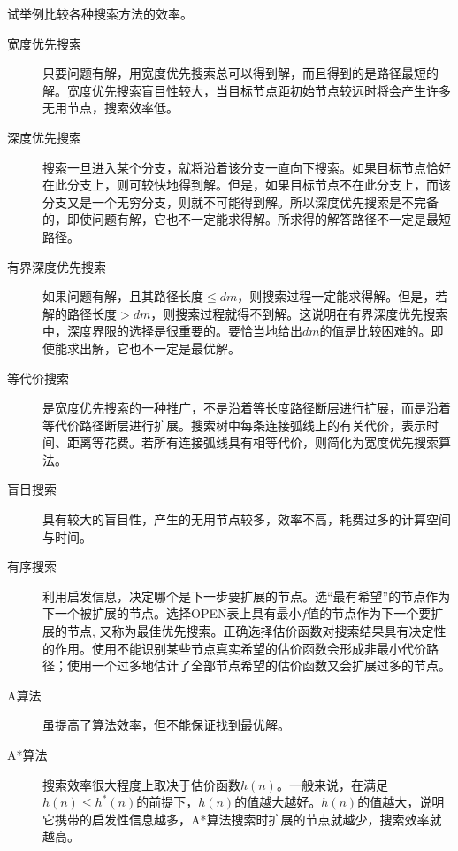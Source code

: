 \begin{question}
试举例比较各种搜索方法的效率。
\end{question}	
\begin{solution}
	\begin{description}
		\item[宽度优先搜索] 只要问题有解，用宽度优先搜索总可以得到解，而且得到的是路径最短的解。宽度优先搜索盲目性较大，当目标节点距初始节点较远时将会产生许多无用节点，搜索效率低。
		\item[深度优先搜索] 搜索一旦进入某个分支，就将沿着该分支一直向下搜索。如果目标节点恰好在此分支上，则可较快地得到解。但是，如果目标节点不在此分支上，而该分支又是一个无穷分支，则就不可能得到解。所以深度优先搜索是不完备的，即使问题有解，它也不一定能求得解。所求得的解答路径不一定是最短路径。
		\item[有界深度优先搜索] 如果问题有解，且其路径长度$\leq dm$，则搜索过程一定能求得解。但是，若解的路径长度$> dm$，则搜索过程就得不到解。这说明在有界深度优先搜索中，深度界限的选择是很重要的。要恰当地给出$dm$的值是比较困难的。即使能求出解，它也不一定是最优解。
		\item[等代价搜索] 是宽度优先搜索的一种推广，不是沿着等长度路径断层进行扩展，而是沿着等代价路径断层进行扩展。搜索树中每条连接弧线上的有关代价，表示时间、距离等花费。若所有连接弧线具有相等代价，则简化为宽度优先搜索算法。
		\item[盲目搜索] 具有较大的盲目性，产生的无用节点较多，效率不高，耗费过多的计算空间与时间。
		\item[有序搜索] 利用启发信息，决定哪个是下一步要扩展的节点。选``最有希望''的节点作为下一个被扩展的节点。选择OPEN表上具有最小$f$值的节点作为下一个要扩展的节点, 又称为最佳优先搜索。正确选择估价函数对搜索结果具有决定性的作用。使用不能识别某些节点真实希望的估价函数会形成非最小代价路径；使用一个过多地估计了全部节点希望的估价函数又会扩展过多的节点。 
		\item[A算法] 虽提高了算法效率，但不能保证找到最优解。
		\item[A*算法] 搜索效率很大程度上取决于估价函数$h(n)$。一般来说，在满足$h(n)\leq h^*(n)$的前提下，$h(n)$的值越大越好。$h(n)$的值越大，说明它携带的启发性信息越多，A*算法搜索时扩展的节点就越少，搜索效率就越高。
	\end{description}

\end{solution}


